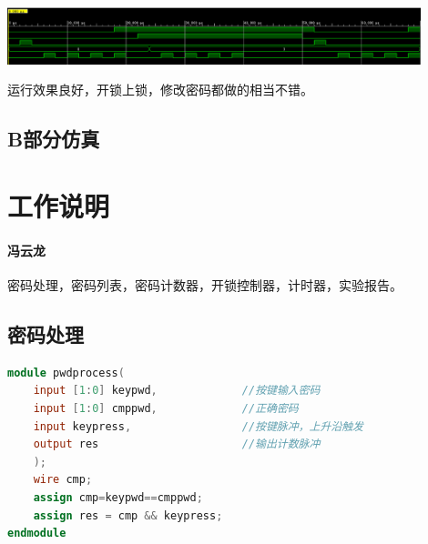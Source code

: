 \documentclass[a4paper,11pt]{ctexart}
\begin{document}
\includegraphics[width=0.9\textwidth]{./images/AlongSimOver.eps}

运行效果良好，开锁上锁，修改密码都做的相当不错。

\subsection{B部分仿真}



\section{工作说明}
\paragraph{冯云龙}密码处理，密码列表，密码计数器，开锁控制器，计时器，实验报告。
\subsection{密码处理}
\begin{lstlisting}[language={verilog}]
module pwdprocess(
    input [1:0] keypwd,             //按键输入密码
    input [1:0] cmppwd,             //正确密码
    input keypress,                 //按键脉冲，上升沿触发
    output res                      //输出计数脉冲
    );
    wire cmp;
    assign cmp=keypwd==cmppwd;
    assign res = cmp && keypress;
endmodule
\end{lstlisting}
\end{document}
